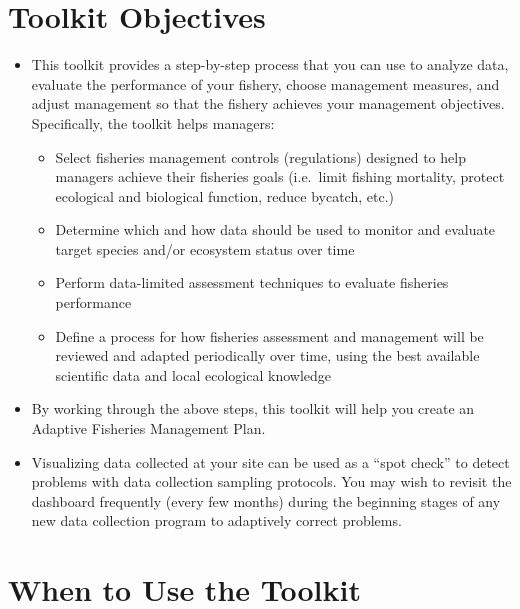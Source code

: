 \documentclass[]{book}
\begin{document}
\section{Toolkit Objectives}\label{toolkit-objectives}

\begin{itemize}
\item
  This toolkit provides a step-by-step process that you can use to
  analyze data, evaluate the performance of your fishery, choose
  management measures, and adjust management so that the fishery
  achieves your management objectives. Specifically, the toolkit helps
  managers:

  \begin{itemize}
  \item
    Select fisheries management controls (regulations) designed to help
    managers achieve their fisheries goals (i.e.~limit fishing
    mortality, protect ecological and biological function, reduce
    bycatch, etc.)
  \item
    Determine which and how data should be used to monitor and evaluate
    target species and/or ecosystem status over time
  \item
    Perform data-limited assessment techniques to evaluate fisheries
    performance
  \item
    Define a process for how fisheries assessment and management will be
    reviewed and adapted periodically over time, using the best
    available scientific data and local ecological knowledge
  \end{itemize}
\item
  By working through the above steps, this toolkit will help you create
  an Adaptive Fisheries Management Plan.
\item
  Visualizing data collected at your site can be used as a ``spot
  check'' to detect problems with data collection sampling protocols.
  You may wish to revisit the dashboard frequently (every few months)
  during the beginning stages of any new data collection program to
  adaptively correct problems.
\end{itemize}

\section{When to Use the Toolkit}\label{when-to-use-the-toolkit}
\end{document}
